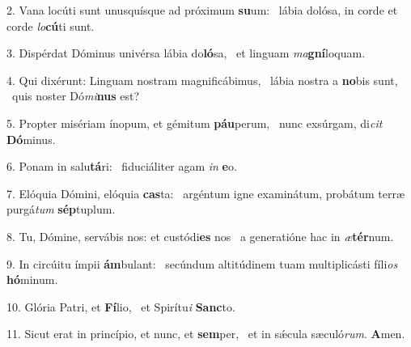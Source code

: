 2. Vana locúti sunt unusquísque ad próximum \textbf{su}um: \ast\  lábia dolósa, in corde et corde \textit{lo}\textbf{cú}ti sunt.\

3. Dispérdat Dóminus univérsa lábia do\textbf{ló}sa, \ast\  et linguam \textit{ma}\textbf{gní}loquam.\

4. Qui dixérunt: Linguam nostram magnificábimus, \dag\  lábia nostra a \textbf{no}bis sunt, \ast\  quis noster Dó\textit{mi}\textbf{nus} est?\

5. Propter misériam ínopum, et gémitum \textbf{páu}perum, \ast\  nunc exsúrgam, di\textit{cit} \textbf{Dó}minus.\

6. Ponam in salu\textbf{tá}ri: \ast\  fiduciáliter agam \textit{in} \textbf{e}o.\

7. Elóquia Dómini, elóquia \textbf{cas}ta: \ast\  argéntum igne examinátum, probátum terræ purgá\textit{tum} \textbf{sép}tuplum.\

8. Tu, Dómine, servábis nos: et custódi\textbf{es} nos \ast\  a generatióne hac in \textit{æ}\textbf{tér}num.\

9. In circúitu ímpii \textbf{ám}bulant: \ast\  secúndum altitúdinem tuam multiplicásti fíli\textit{os} \textbf{hó}minum.\

10. Glória Patri, et \textbf{Fí}lio, \ast\  et Spirítu\textit{i} \textbf{Sanc}to.\

11. Sicut erat in princípio, et nunc, et \textbf{sem}per, \ast\  et in sǽcula sæculó\textit{rum}. \textbf{A}men.\

